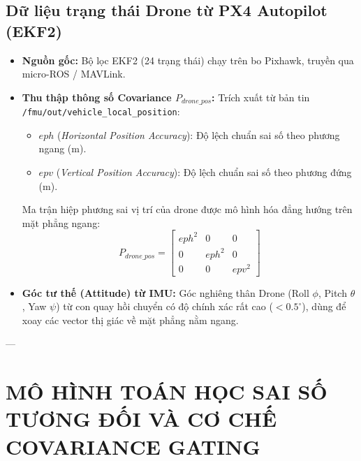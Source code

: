\documentclass[12pt,a4paper]{article}
\begin{document}
\subsection{Dữ liệu trạng thái Drone từ PX4 Autopilot (EKF2)}
\begin{itemize}[noitemsep,topsep=2pt]
    \item \textbf{Nguồn gốc:} Bộ lọc EKF2 (24 trạng thái) chạy trên bo Pixhawk, truyền qua micro-ROS / MAVLink.
    \item \textbf{Thu thập thông số Covariance $P_{drone\_pos}$:}
    Trích xuất từ bản tin \texttt{/fmu/out/vehicle\_local\_position}:
    \begin{itemize}[noitemsep]
        \item $eph$ (\textit{Horizontal Position Accuracy}): Độ lệch chuẩn sai số theo phương ngang (m).
        \item $epv$ (\textit{Vertical Position Accuracy}): Độ lệch chuẩn sai số theo phương đứng (m).
    \end{itemize}
    Ma trận hiệp phương sai vị trí của drone được mô hình hóa đẳng hướng trên mặt phẳng ngang:
    \begin{equation}
        P_{drone\_pos} = \begin{bmatrix}
            eph^2 & 0 & 0 \\
            0 & eph^2 & 0 \\
            0 & 0 & epv^2
        \end{bmatrix}
    \end{equation}
    \item \textbf{Góc tư thế (Attitude) từ IMU:} Góc nghiêng thân Drone (Roll $\phi$, Pitch $\theta$, Yaw $\psi$) từ con quay hồi chuyển có độ chính xác rất cao ($< 0.5^\circ$), dùng để xoay các vector thị giác về mặt phẳng nằm ngang.
\end{itemize}

---

\section{MÔ HÌNH TOÁN HỌC SAI SỐ TƯƠNG ĐỐI VÀ CƠ CHẾ COVARIANCE GATING}
\end{document}
